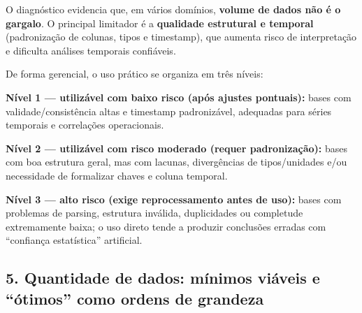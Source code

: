 O diagnóstico evidencia que, em vários domínios, \textbf{volume de dados
não é o gargalo}. O principal limitador é a \textbf{qualidade estrutural
e temporal} (padronização de colunas, tipos e timestamp), que aumenta
risco de interpretação e dificulta análises temporais confiáveis.

De forma gerencial, o uso prático se organiza em três níveis:

\textbf{Nível 1 --- utilizável com baixo risco (após ajustes pontuais):}
bases com validade/consistência altas e timestamp padronizável,
adequadas para séries temporais e correlações operacionais.

\textbf{Nível 2 --- utilizável com risco moderado (requer
padronização):} bases com boa estrutura geral, mas com lacunas,
divergências de tipos/unidades e/ou necessidade de formalizar chaves e
coluna temporal.

\textbf{Nível 3 --- alto risco (exige reprocessamento antes de uso):}
bases com problemas de parsing, estrutura inválida, duplicidades ou
completude extremamente baixa; o uso direto tende a produzir conclusões
erradas com ``confiança estatística'' artificial.

\newpage

\subsection{\texorpdfstring{\textbf{5. Quantidade de dados: mínimos
viáveis e ``ótimos'' como ordens de
grandeza}}{5. Quantidade de dados: mínimos viáveis e ``ótimos'' como ordens de grandeza}}\label{quantidade-de-dados-muxednimos-viuxe1veis-e-uxf3timos-como-ordens-de-grandeza}

